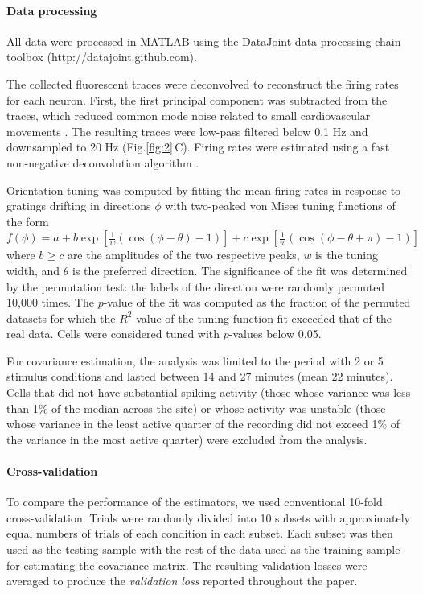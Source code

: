 \documentclass[10pt]{article}
\newcommand{\figref}[2]{Fig.\;\ref{fig:#1}\,#2}
\begin{document}
\paragraph{Data processing}
All data were processed in MATLAB using the DataJoint data processing chain toolbox (http://datajoint.github.com). 

The collected fluorescent traces were deconvolved to reconstruct the firing rates for each neuron. First, the first principal component was subtracted from the traces, which reduced common mode noise related to small cardiovascular movements \cite{Cotton:2013}. The resulting traces were low-pass filtered below 0.1 Hz and downsampled to 20 Hz (\figref{2}{C}). Firing rates were estimated using a fast non-negative deconvolution algorithm \cite{Vogelstein:2010}.

Orientation tuning was computed by fitting the mean firing rates in response to gratings drifting in directions $\phi$ with two-peaked von Mises tuning functions of the form $f(\phi)=a + b\exp\left[\frac 1 w(\cos(\phi-\theta)-1) \right] + c\exp\left[\frac 1 w(\cos(\phi-\theta+\pi)-1) \right]$ where $b\ge c$ are the amplitudes of the two respective peaks, $w$ is the tuning width, and  $\theta$ is the preferred direction. The significance of the fit was determined by the permutation test: the labels of the direction were randomly permuted 10,000 times.  The $p$-value of the fit was computed as the fraction of the permuted datasets for which the $R^2$ value of the tuning function fit exceeded that of the real data.  Cells were considered tuned with $p$-values below 0.05.

For covariance estimation, the analysis was limited to the period with 2 or 5 stimulus conditions and lasted between 14 and 27 minutes (mean 22 minutes).  Cells that did not have substantial spiking activity (those whose variance was less than 1\% of the median across the site) or whose activity was unstable (those whose variance in the least active quarter of the recording did not exceed 1\% of the variance in the most active quarter) were excluded from the analysis.

\paragraph{Cross-validation}
To compare the performance of the estimators, we used conventional 10-fold cross-validation: Trials were randomly divided into 10 subsets with approximately equal numbers of trials of each condition in each subset. Each subset was then used as the testing sample with the rest of the data used as the training sample for estimating the covariance matrix. The resulting validation losses were averaged to produce the \emph{validation loss} reported throughout the paper.
\end{document}
